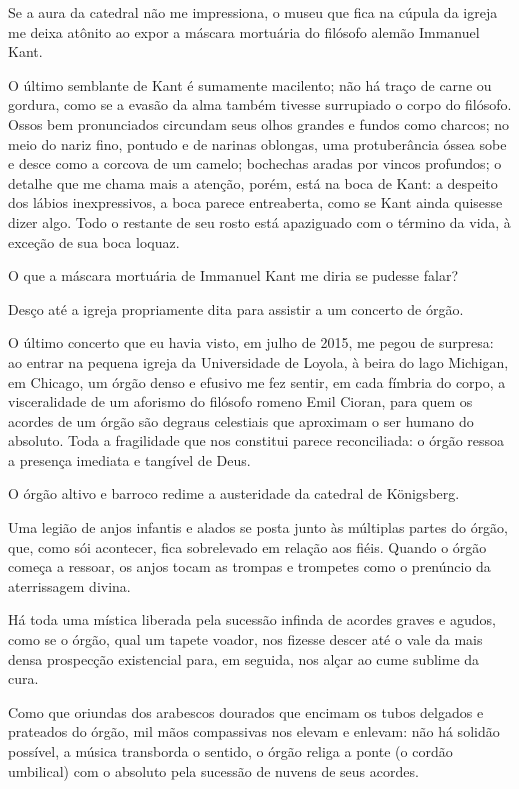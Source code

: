 Se a aura da catedral não me impressiona, o museu que fica na cúpula da
igreja me deixa atônito ao expor a máscara mortuária do filósofo alemão
Immanuel Kant.

O último semblante de Kant é sumamente macilento; não há traço de carne
ou gordura, como se a evasão da alma também tivesse surrupiado o corpo
do filósofo. Ossos bem pronunciados circundam seus olhos grandes e
fundos como charcos; no meio do nariz fino, pontudo e de narinas
oblongas, uma protuberância óssea sobe e desce como a corcova de um
camelo; bochechas aradas por vincos profundos; o detalhe que me chama
mais a atenção, porém, está na boca de Kant: a despeito dos lábios
inexpressivos, a boca parece entreaberta, como se Kant ainda quisesse
dizer algo. Todo o restante de seu rosto está apaziguado com o término
da vida, à exceção de sua boca loquaz.

O que a máscara mortuária de Immanuel Kant me diria se pudesse falar?

Desço até a igreja propriamente dita para assistir a um concerto de
órgão.

O último concerto que eu havia visto, em julho de 2015, me pegou de
surpresa: ao entrar na pequena igreja da Universidade de Loyola, à beira
do lago Michigan, em Chicago, um órgão denso e efusivo me fez sentir, em
cada fímbria do corpo, a visceralidade de um aforismo do filósofo romeno
Emil Cioran, para quem os acordes de um órgão são degraus celestiais que
aproximam o ser humano do absoluto. Toda a fragilidade que nos constitui
parece reconciliada: o órgão ressoa a presença imediata e tangível de
Deus.

O órgão altivo e barroco redime a austeridade da catedral de Königsberg.

Uma legião de anjos infantis e alados se posta junto às múltiplas partes
do órgão, que, como sói acontecer, fica sobrelevado em relação aos
fiéis. Quando o órgão começa a ressoar, os anjos tocam as trompas e
trompetes como o prenúncio da aterrissagem divina.

Há toda uma mística liberada pela sucessão infinda de acordes graves e
agudos, como se o órgão, qual um tapete voador, nos fizesse descer até o
vale da mais densa prospecção existencial para, em seguida, nos alçar ao
cume sublime da cura.

Como que oriundas dos arabescos dourados que encimam os tubos delgados e
prateados do órgão, mil mãos compassivas nos elevam e enlevam: não há
solidão possível, a música transborda o sentido, o órgão religa a ponte
(o cordão umbilical) com o absoluto pela sucessão de nuvens de seus
acordes.

